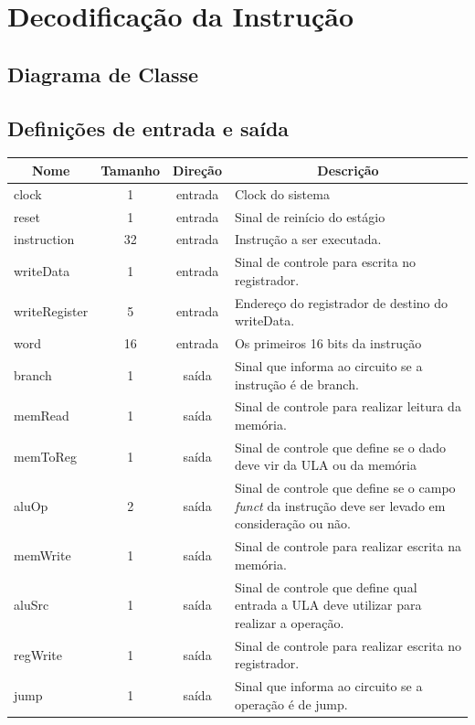 \section{Decodificação da Instrução}
	\subsection{Diagrama de Classe}
  \begin{figure}[htpb!]
    
  \end{figure}
		
		\subsection{Definições de entrada e saída}
		
	\begin{center}
		\begin{longtable}[pos]{| l | c | c | m{7cm} |} \hline
			\multicolumn{1}{|c|}{\cellcolor[gray]{0.9}\textbf{Nome}} & 
			\multicolumn{1}{c|}{\cellcolor[gray]{0.9}\textbf{Tamanho}} & 
			\multicolumn{1}{c|}{\cellcolor[gray]{0.9}\textbf{Direção}} &
			\multicolumn{1}{c|}{\cellcolor[gray]{0.9}\textbf{Descrição}} \\ \hline
			\endhead
			\hline
			\endlastfoot
			
			clock & 1 & entrada & Clock do sistema \\ \hline
			reset & 1 & entrada & Sinal de reinício do estágio\\ \hline
			instruction & 32 & entrada & Instrução a ser executada. \\ \hline
			writeData & 1 & entrada & Sinal de controle para escrita no registrador. \\ \hline
			writeRegister & 5 & entrada & Endereço do registrador de destino do writeData. \\ \hline
			word & 16 & entrada & Os primeiros 16 bits da instrução \\ \hline
			branch & 1 & saída & Sinal que informa ao circuito se a instrução é de branch. \\ \hline
			memRead & 1 & saída & Sinal de controle para realizar leitura da memória. \\ \hline
			memToReg & 1 & saída & Sinal de controle que define se o dado deve vir da ULA ou da memória \\ \hline
			aluOp & 2 & saída & Sinal de controle que define se o campo \textit{funct} da instrução deve ser levado em consideração ou não. \\ \hline
			memWrite & 1 & saída & Sinal de controle para realizar escrita na memória. \\ \hline
			aluSrc & 1 & saída & Sinal de controle que define qual entrada a ULA deve utilizar para realizar a operação. \\ \hline
			regWrite & 1 & saída & Sinal de controle para realizar escrita no registrador. \\ \hline
			jump & 1 & saída & Sinal que informa ao circuito se a operação é de jump. \\ \hline
		\end{longtable}
	\end{center}
    
